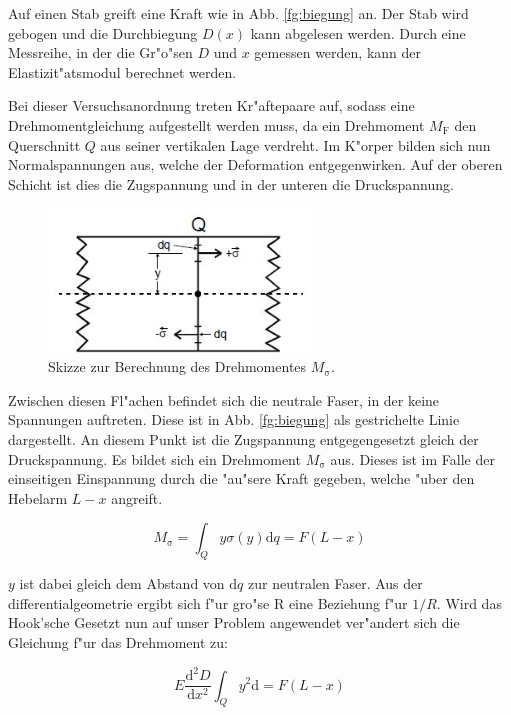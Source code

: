 Auf einen Stab greift eine Kraft wie in Abb. \ref{fg:biegung} an. Der Stab wird gebogen und die Durchbiegung $D(x)$ kann abgelesen werden. Durch eine Messreihe, in der die Gr"o"sen $D$ und $x$ gemessen werden, kann der Elastizit"atsmodul berechnet werden.

Bei dieser Versuchsanordnung treten Kr"aftepaare auf, sodass eine Drehmomentgleichung aufgestellt werden muss, da ein Drehmoment $M_\mathrm{F}$ den Querschnitt $Q$ aus seiner vertikalen Lage verdreht. Im K"orper bilden sich nun Normalspannungen aus, welche der Deformation entgegenwirken. Auf der oberen Schicht ist dies die Zugspannung und in der unteren die Druckspannung.

\begin{figure}
\centering
\includegraphics[width = 7cm]{img/berechnung.JPG}
\caption{Skizze zur Berechnung des Drehmomentes $M_\mathrm{\sigma}$.\cite{anleitung}}
\label{fg:berechnung}
\end{figure}

Zwischen diesen Fl"achen befindet sich die neutrale Faser, in der keine Spannungen auftreten. Diese ist in Abb. \ref{fg:biegung} als gestrichelte Linie dargestellt. An diesem Punkt ist die Zugspannung entgegengesetzt gleich der Druckspannung. Es bildet sich ein Drehmoment $M_\mathrm{\sigma}$ aus.
Dieses ist im Falle der einseitigen Einspannung durch die "au"sere Kraft gegeben, welche "uber den Hebelarm $L-x$ angreift.

\begin{equation}
M_\mathrm{\sigma} = \int_Q y \sigma(y)\mathrm{d}q = F(L-x)
\end{equation}

$y$ ist dabei gleich dem Abstand von $\mathrm{d}q$ zur neutralen Faser. Aus der differentialgeometrie ergibt sich f"ur gro"se R eine Beziehung f"ur $1/R$. Wird das Hook'sche Gesetzt nun auf unser Problem angewendet ver"andert sich die Gleichung f"ur das Drehmoment zu:

\begin{equation}
E \frac{\mathrm{d}^2D}{\mathrm{d}x^2} \int_Q y^2 \mathrm{d} = F (L-x)
\end{equation}


